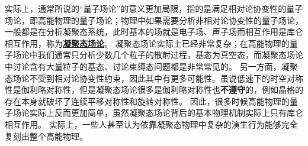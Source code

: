 \documentclass[hyperref, UTF8, a4paper]{ctexbook}
\newcommand{\concept}[1]{\underline{\textbf{#1}}}
\renewcommand{\emph}{\textbf}
\begin{document}
实际上，通常所说的“量子场论”的意义更加局限，指的是满足相对论协变性的量子场论，即高能物理的量子场论；物理中如果需要分析非相对论协变性的量子场论，一般都是在分析凝聚态系统，此时基本的场就是电子场、声子场而相互作用是库仑相互作用，称为\concept{凝聚态场论}。
凝聚态场论实际上已经非常复杂；在高能物理的量子场论中我们通常只分析少数几个粒子的散射过程，基态为真空态，而凝聚态场论中讨论含有大量粒子的基态、讨论束缚态问题都是非常常见的。
另一方面，凝聚态场论不受到相对论协变性约束，因此其中有更多可能性。虽说低速下的时空对称性是伽利略对称性，但是凝聚态场论很多是伽利略对称性也\emph{不遵守}的，例如晶格的存在本身就破坏了连续平移对称性和旋转对称性。
因此，很多时候高能物理的量子场论实际上反而更加简单，虽然凝聚态场论背后的基本物理机制实际上只有库仑相互作用。
实际上，一些人甚至认为依靠凝聚态物理中复杂的演生行为能够完全复刻出整个高能物理。
\end{document}
